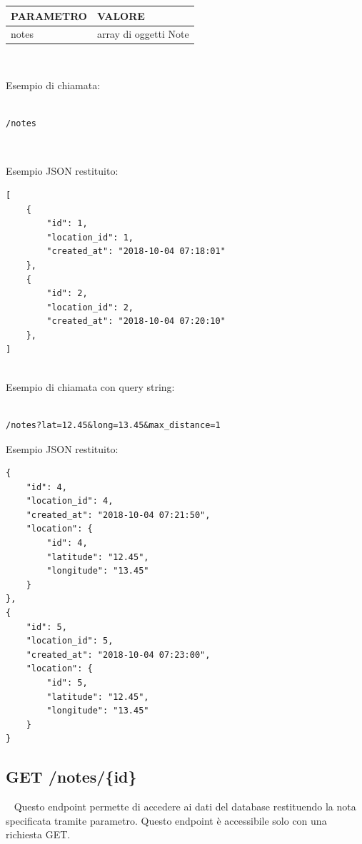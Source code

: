 \begin{table}[!h]
	\centering
	\begin{tabular}{@{}ll@{}}
		\toprule
		\textbf{PARAMETRO} & \textbf{VALORE}  \\ \midrule
		notes              & array di oggetti Note \\ \bottomrule
	\end{tabular}
\end{table}

\ \linebreak

Esempio di chiamata:
\begin{lstlisting}

/notes

\end{lstlisting}

\ \linebreak

Esempio JSON restituito:
\begin{lstlisting}
[
	{
		"id": 1,
		"location_id": 1,
		"created_at": "2018-10-04 07:18:01"
	},
	{
		"id": 2,
		"location_id": 2,
		"created_at": "2018-10-04 07:20:10"
	},
]


\end{lstlisting}

Esempio di chiamata con query string:
\begin{lstlisting}

/notes?lat=12.45&long=13.45&max_distance=1

\end{lstlisting}

Esempio JSON restituito:
\begin{lstlisting}
{
	"id": 4,
	"location_id": 4,
	"created_at": "2018-10-04 07:21:50",
	"location": {
		"id": 4,
		"latitude": "12.45",
		"longitude": "13.45"
	}
},
{
	"id": 5,
	"location_id": 5,
	"created_at": "2018-10-04 07:23:00",
	"location": {
		"id": 5,
		"latitude": "12.45",
		"longitude": "13.45"
	}
}

\end{lstlisting}


\subsection{GET /notes/\{id\}}
\ \linebreak
Questo endpoint permette di accedere ai dati del database restituendo la nota specificata tramite parametro. Questo endpoint è accessibile solo con una richiesta GET.


